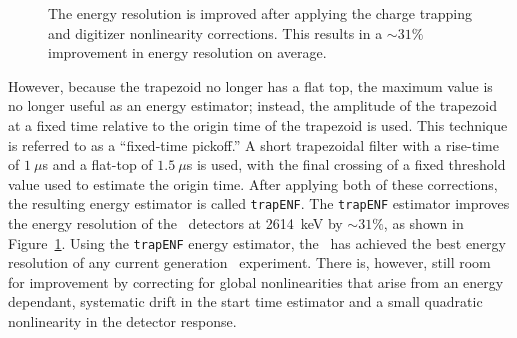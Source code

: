 \documentclass[/main.tex]{subfiles}
\begin{document}
\begin{figure}
  \centering
  \caption[Improvement in energy resolution from charge trapping correction]{\label{fig:trapenf}
    The energy resolution is improved after applying the charge trapping and digitizer nonlinearity corrections. This results in a ${\sim}31\%$ improvement in energy resolution on average.
  }
\end{figure}
However, because the trapezoid no longer has a flat top, the maximum value is no longer useful as an energy estimator; instead, the amplitude of the trapezoid at a fixed time relative to the origin time of the trapezoid is used.
This technique is referred to as a ``fixed-time pickoff.''
A short trapezoidal filter with a rise-time of $1~\mu$s and a flat-top of $1.5~\mu$s is used, with the final crossing of a fixed threshold value used to estimate the origin time.
After applying both of these corrections, the resulting energy estimator is called \texttt{trapENF}.
The \texttt{trapENF} estimator improves the energy resolution of the \MJD\ detectors at 2614~keV by ${\sim}31\%$, as shown in Figure~\ref{fig:trapenf}.
Using the \texttt{trapENF} energy estimator, the \MJD\ has achieved the best energy resolution of any current generation \znbb\ experiment.
There is, however, still room for improvement by correcting for global nonlinearities that arise from an energy dependant, systematic drift in the start time estimator and a small quadratic nonlinearity in the detector response.
\end{document}
